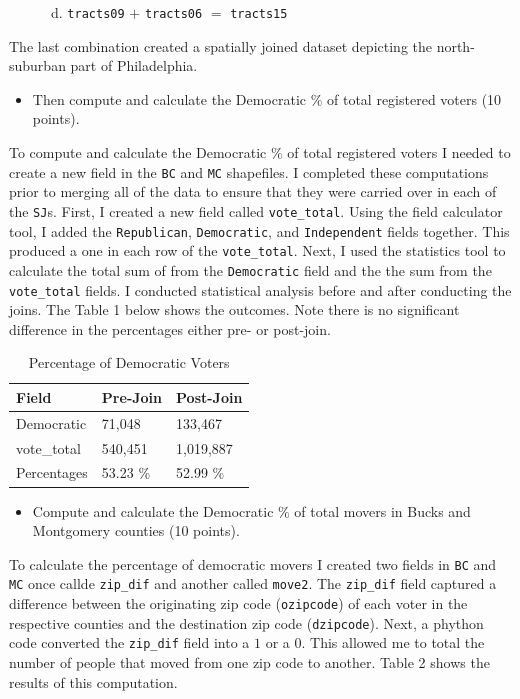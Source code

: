\documentclass[]{article}
\providecommand{\tightlist}{%
  \setlength{\itemsep}{0pt}\setlength{\parskip}{0pt}}
\begin{document}
~~~~~~d. \texttt{tracts09} \(+\) \texttt{tracts06} \(=\)
\texttt{tracts15}

The last combination created a spatially joined dataset depicting the
north-suburban part of Philadelphia.

\begin{itemize}
\tightlist
\item
  Then compute and calculate the Democratic \(\%\) of total registered
  voters (10 points).
\end{itemize}

To compute and calculate the Democratic \(\%\) of total registered
voters I needed to create a new field in the \texttt{BC} and \texttt{MC}
shapefiles. I completed these computations prior to merging all of the
data to ensure that they were carried over in each of the \texttt{SJ}s.
First, I created a new field called \texttt{vote\_total}. Using the
field calculator tool, I added the \texttt{Republican},
\texttt{Democratic}, and \texttt{Independent} fields together. This
produced a one in each row of the \texttt{vote\_total}. Next, I used the
statistics tool to calculate the total sum of from the
\texttt{Democratic} field and the the sum from the \texttt{vote\_total}
fields. I conducted statistical analysis before and after conducting the
joins. The Table 1 below shows the outcomes. Note there is no
significant difference in the percentages either pre- or post-join.

\begin{table}[]
\centering
\caption{Percentage of Democratic Voters}
\begin{tabular}{lll}
Field       & Pre-Join & Post-Join \\
\hline
Democratic  & 71,048   & 133,467   \\
vote\_total & 540,451  & 1,019,887 \\
\hline
\hline
Percentages & 53.23 \% & 52.99 \% 
\end{tabular}
\end{table}

\begin{itemize}
\tightlist
\item
  Compute and calculate the Democratic \(\%\) of total movers in Bucks
  and Montgomery counties (10 points).
\end{itemize}

To calculate the percentage of democratic movers I created two fields in
\texttt{BC} and \texttt{MC} once callde \texttt{zip\_dif} and another
called \texttt{move2}. The \texttt{zip\_dif} field captured a difference
between the originating zip code (\texttt{ozipcode}) of each voter in
the respective counties and the destination zip code
(\texttt{dzipcode}). Next, a phython code converted the
\texttt{zip\_dif} field into a \(1\) or a \(0\). This allowed me to
total the number of people that moved from one zip code to another.
Table 2 shows the results of this computation.
\end{document}
